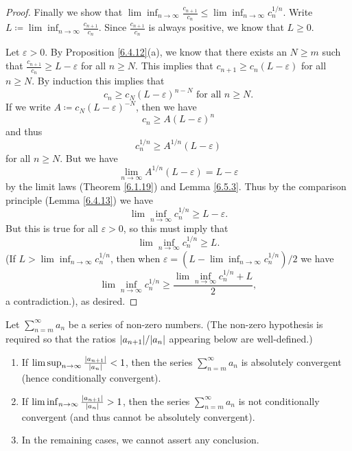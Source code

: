 \begin{proof}
Finally we show that \(\lim\inf_{n \to \infty} \frac{c_{n + 1}}{c_n} \leq \lim\inf_{n \to \infty} c_n^{1 / n}\).
Write \(L \coloneqq \lim\inf_{n \to \infty} \frac{c_{n + 1}}{c_n}\).
Since \(\frac{c_{n + 1}}{c_n}\) is always positive, we know that \(L \geq 0\).

Let \(\varepsilon > 0\).
By Proposition \ref{6.4.12}(a), we know that there exists an \(N \geq m\) such that \(\frac{c_{n + 1}}{c_n} \geq L - \varepsilon\) for all \(n \geq N\).
This implies that \(c_{n + 1} \geq c_n (L - \varepsilon)\) for all \(n \geq N\).
By induction this implies that
\[
    c_n \geq c_N (L - \varepsilon)^{n - N} \text{ for all } n \geq N.
\]
If we write \(A \coloneqq c_N (L - \varepsilon)^{-N}\), then we have
\[
    c_n \geq A(L - \varepsilon)^n
\]
and thus
\[
    c_n^{1 / n} \geq A^{1 / n} (L - \varepsilon)
\]
for all \(n \geq N\).
But we have
\[
    \lim_{n \to \infty} A^{1 / n} (L - \varepsilon) = L - \varepsilon
\]
by the limit laws (Theorem \ref{6.1.19}) and Lemma \ref{6.5.3}.
Thus by the comparison principle (Lemma \ref{6.4.13}) we have
\[
    \lim\inf_{n \to \infty} c_n^{1 / n} \geq L - \varepsilon.
\]
But this is true for all \(\varepsilon > 0\), so this must imply that
\[
    \lim\inf_{n \to \infty} c_n^{1 / n} \geq L.
\]
(If \(L > \lim\inf_{n \to \infty} c_n^{1 / n}\), then when \(\varepsilon = (L - \lim\inf_{n \to \infty} c_n^{1 / n}) / 2\) we have
\[
    \lim\inf_{n \to \infty} c_n^{1 / n} \geq \frac{\lim\inf_{n \to \infty} c_n^{1 / n} + L}{2},
\]
a contradiction.), as desired.
\end{proof}

\begin{corollary}\label{7.5.3}
Let \(\sum_{n = m}^\infty a_n\) be a series of non-zero numbers.
(The non-zero hypothesis is required so that the ratios \(\abs*{a_{n + 1}} / \abs*{a_n}\) appearing below are well-defined.)
\begin{enumerate}
    \item If \(\lim\sup_{n \to \infty} \frac{\abs*{a_{n + 1}}}{\abs*{a_n}} < 1\), then the series \(\sum_{n = m}^\infty a_n\) is absolutely convergent (hence conditionally convergent).
    \item If \(\lim\inf_{n \to \infty} \frac{\abs*{a_{n + 1}}}{\abs*{a_n}} > 1\), then the series \(\sum_{n = m}^\infty a_n\) is not conditionally convergent (and thus cannot be absolutely convergent).
    \item In the remaining cases, we cannot assert any conclusion.
\end{enumerate}
\end{corollary}

